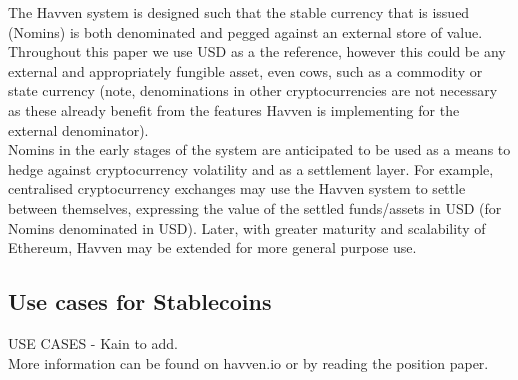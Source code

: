 \documentclass{article}
\begin{document}
\noindent The Havven system is designed such that the stable currency that is issued (Nomins) is both denominated and pegged against an external store of value. Throughout this paper we use USD as a the reference, however this could be any external and appropriately fungible asset, even cows, such as a commodity or state currency (note, denominations in other cryptocurrencies are not necessary as these already benefit from the features Havven is implementing for the external denominator). \\

\noindent Nomins in the early stages of the system are anticipated to be used as a means to hedge against cryptocurrency volatility and as a settlement layer. For example, centralised cryptocurrency exchanges may use the Havven system to settle between themselves, expressing the value of the settled funds/assets in USD (for Nomins denominated in USD). Later, with greater maturity and scalability of Ethereum, Havven may be extended for more general purpose use. \\


\subsection{Use cases for Stablecoins}
\noindent USE CASES - Kain to add. \\

\noindent More information can be found on havven.io or by reading the position paper.

\pagebreak
\end{document}
